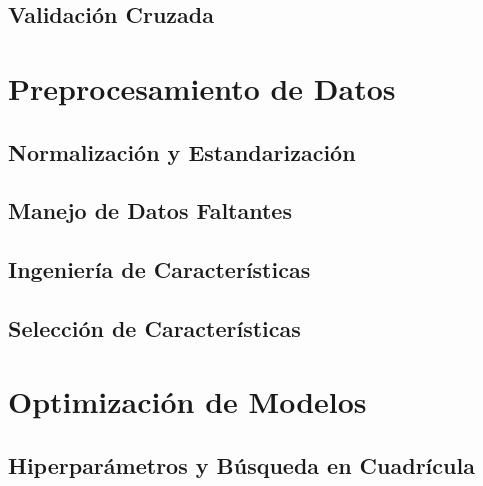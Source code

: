 \documentclass[12pt]{article}
\begin{document}
\subsection{Validación Cruzada}
\newpage
\section{Preprocesamiento de Datos}

\subsection{Normalización y Estandarización}
\newpage
\subsection{Manejo de Datos Faltantes}
\newpage
\subsection{Ingeniería de Características}
\newpage
\subsection{Selección de Características}
\newpage
\section{Optimización de Modelos}

\subsection{Hiperparámetros y Búsqueda en Cuadrícula}
\newpage
\end{document}

